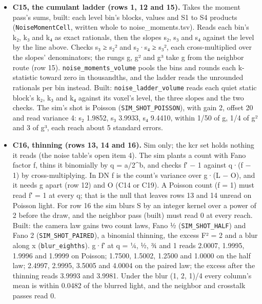 \begin{enumerate}
\begin{itemize}
\item \textbf{C15, the cumulant ladder (rows 1, 12 and 15).} Takes the moment pass's sums, built: each level bin's blocks, values and S1 to S4 products (\texttt{Noise\allowbreak{}Moment\allowbreak{}Cell}, written whole to noise\_\allowbreak{}moments.tsv). Reads each bin's k₂, k₃ and k₄ as exact rationals, then the slopes s₂, s₃ and s₄ against the level by the line above. Checks s₃ ≥ s₂² and s₂·s₄ ≥ s₃², each cross-multiplied over the slopes' denominators; the rungs g, g² and g³ take g from the neighbor route (row 15). \texttt{noise\_\allowbreak{}moments\_\allowbreak{}volume} pools the bins and rounds each k-statistic toward zero in thousandths, and the ladder reads the unrounded rationals per bin instead. Built: \texttt{noise\_\allowbreak{}ladder\_\allowbreak{}volume} reads each quiet static block's k₂, k₃ and k₄ against its voxel's level, the three slopes and the two checks. The sim's shot is Poisson (\texttt{SIM\_\allowbreak{}SHOT\_\allowbreak{}POISSON}), with gain 2, offset 20 and read variance 4: s₂ 1.9852, s₃ 3.9933, s₄ 9.4410, within 1/50 of g, 1/4 of g² and 3 of g³, each reach about 5 standard errors.
\item \textbf{C16, thinning (rows 13, 14 and 16).} Sim only; the kcr set holds nothing it reads (the noise table's open item 4). The sim plants a count with Fano factor f, thins it binomially by q = a/2\textasciicircum{}b, and checks f′ − 1 against q·(f − 1) by cross-multiplying. In DN f is the count's variance over g·(L − O), and it needs g apart (row 12) and O (C14 or C19). A Poisson count (f = 1) must read f′ = 1 at every q; that is the null that leaves rows 13 and 14 unread on Poisson light. For row 16 the sim blurs S by an integer kernel over a power of 2 before the draw, and the neighbor pass (built) must read 0 at every reach. Built: the camera law gains two count laws, Fano ½ (\texttt{SIM\_\allowbreak{}SHOT\_\allowbreak{}HALF}) and Fano 2 (\texttt{SIM\_\allowbreak{}SHOT\_\allowbreak{}PAIRED}), a binomial thinning, the excess F² = 2 and a blur along x (\texttt{blur\_\allowbreak{}eighths}). g·f′ at q = ¼, ½, ¾ and 1 reads 2.0007, 1.9995, 1.9996 and 1.9999 on Poisson; 1.7500, 1.5002, 1.2500 and 1.0000 on the half law; 2.4997, 2.9995, 3.5005 and 4.0004 on the paired law; the excess after the thinning reads 3.9993 and 3.9981. Under the blur (1, 2, 1)/4 every column's mean is within 0.0482 of the blurred light, and the neighbor and crosstalk passes read 0.

\end{itemize}
\end{enumerate}

